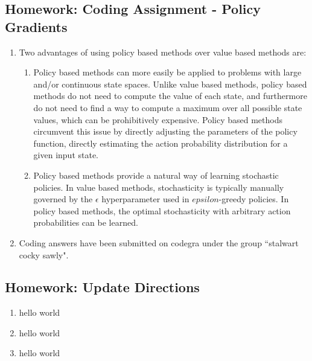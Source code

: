 \documentclass{article}
\begin{document}
\subsection{Homework: Coding Assignment - Policy Gradients}
\begin{enumerate}
	\item Two advantages of using policy based methods over value based methods are:
	      \begin{enumerate}
		      \item Policy based methods can more easily be applied to problems with large and/or
		            continuous state spaces. Unlike value based methods, policy based methods do not
		            need to compute the value of each state, and furthermore do not need to find a way
		            to compute a maximum over all possible state values, which can be prohibitively
		            expensive. Policy based methods circumvent this issue by directly adjusting the
		            parameters of the policy function, directly estimating the action probability
		            distribution for a given input state.
		      \item Policy based methods provide a natural way of learning stochastic policies. In value
		            based methods, stochasticity is typically manually governed by the $\epsilon$
		            hyperparameter used in $epsilon$-greedy policies. In policy based methods, the optimal
		            stochasticity with arbitrary action probabilities can be learned.
	      \end{enumerate}
	\item Coding answers have been submitted on codegra under the group ``stalwart cocky sawly".
\end{enumerate}

\setcounter{section}{10}
\setcounter{subsection}{2}
\subsection{Homework: Update Directions}
\begin{enumerate}
	\item hello world
	\item hello world
	\item hello world
\end{enumerate}
\end{document}
